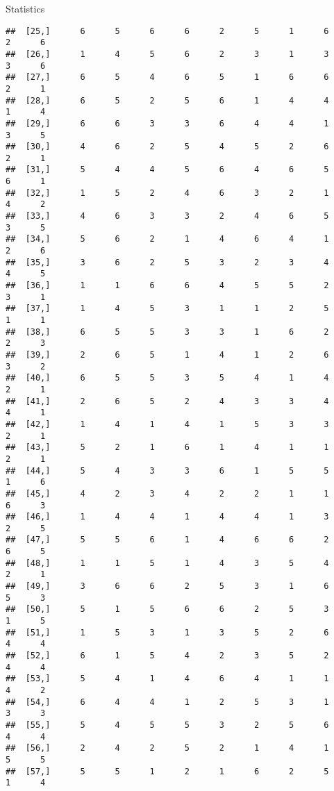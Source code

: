 \documentclass[
  ignorenonframetext,
]{beamer}
\begin{document}
\begin{frame}[fragile]{Statistics}
\begin{verbatim}
##  [25,]      6      5      6      6      2      5      1      6      2      6
##  [26,]      1      4      5      6      2      3      1      3      3      6
##  [27,]      6      5      4      6      5      1      6      6      2      1
##  [28,]      6      5      2      5      6      1      4      4      1      4
##  [29,]      6      6      3      3      6      4      4      1      3      5
##  [30,]      4      6      2      5      4      5      2      6      2      1
##  [31,]      5      4      4      5      6      4      6      5      6      1
##  [32,]      1      5      2      4      6      3      2      1      4      2
##  [33,]      4      6      3      3      2      4      6      5      3      5
##  [34,]      5      6      2      1      4      6      4      1      2      6
##  [35,]      3      6      2      5      3      2      3      4      4      5
##  [36,]      1      1      6      6      4      5      5      2      3      1
##  [37,]      1      4      5      3      1      1      2      5      1      1
##  [38,]      6      5      5      3      3      1      6      2      2      3
##  [39,]      2      6      5      1      4      1      2      6      3      2
##  [40,]      6      5      5      3      5      4      1      4      2      1
##  [41,]      2      6      5      2      4      3      3      4      4      1
##  [42,]      1      4      1      4      1      5      3      3      2      1
##  [43,]      5      2      1      6      1      4      1      1      2      1
##  [44,]      5      4      3      3      6      1      5      5      1      6
##  [45,]      4      2      3      4      2      2      1      1      6      3
##  [46,]      1      4      4      1      4      4      1      3      2      5
##  [47,]      5      5      6      1      4      6      6      2      6      5
##  [48,]      1      1      5      1      4      3      5      4      2      1
##  [49,]      3      6      6      2      5      3      1      6      5      3
##  [50,]      5      1      5      6      6      2      5      3      1      5
##  [51,]      1      5      3      1      3      5      2      6      4      4
##  [52,]      6      1      5      4      2      3      5      2      4      4
##  [53,]      5      4      1      4      6      4      1      1      4      2
##  [54,]      6      4      4      1      2      5      3      1      3      3
##  [55,]      5      4      5      5      3      2      5      6      4      4
##  [56,]      2      4      2      5      2      1      4      1      5      5
##  [57,]      5      5      1      2      1      6      2      5      1      4

\end{verbatim}
\end{frame}
\end{document}
